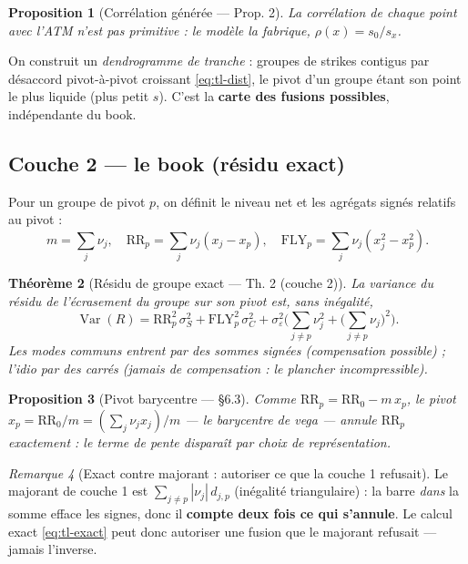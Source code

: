 \documentclass[11pt,a4paper]{article}
\DeclareMathOperator{\Var}{Var}
\newcommand{\abs}[1]{\left| #1 \right|}
\theoremstyle{plain}
\newtheorem{theoreme}{Théorème}[section]
\newtheorem{proposition}[theoreme]{Proposition}
\theoremstyle{definition}
\theoremstyle{remark}
\newtheorem{remarque}[theoreme]{Remarque}
\begin{document}
\begin{proposition}[Corrélation générée --- Prop. 2]
La corrélation de chaque point avec l'ATM n'est pas primitive : le modèle la fabrique,
$\rho(x) = s_0 / s_x$.
\end{proposition}

On construit un \emph{dendrogramme de tranche} : groupes de strikes contigus par
désaccord pivot-à-pivot croissant \eqref{eq:tl-dist}, le pivot d'un groupe étant son
point le plus liquide (plus petit $s$). C'est la \textbf{carte des fusions possibles},
indépendante du book.

\subsection{Couche 2 --- le book (résidu exact)}
Pour un groupe de pivot $p$, on définit le niveau net et les agrégats signés relatifs au
pivot :
\[ m = \textstyle\sum_j \nu_j,\quad
   \mathrm{RR}_p = \textstyle\sum_j \nu_j (x_j - x_p),\quad
   \mathrm{FLY}_p = \textstyle\sum_j \nu_j (x_j^2 - x_p^2). \]

\begin{theoreme}[Résidu de groupe exact --- Th. 2 (couche 2)]\label{th:tl2}
La variance du résidu de l'écrasement du groupe sur son pivot est, \emph{sans
inégalité},
\begin{equation}
\Var(R) = \mathrm{RR}_p^2\,\sigma_S^2 + \mathrm{FLY}_p^2\,\sigma_C^2
+ \sigma_\varepsilon^2\Big(\textstyle\sum_{j\neq p}\nu_j^2
+ \big(\sum_{j\neq p}\nu_j\big)^2\Big).
\label{eq:tl-exact}
\end{equation}
Les modes communs entrent par des sommes \emph{signées} (compensation possible) ;
l'idio par des \emph{carrés} (jamais de compensation : le plancher incompressible).
\end{theoreme}

\begin{proposition}[Pivot barycentre --- \S6.3]\label{prop:bary}
Comme $\mathrm{RR}_p = \mathrm{RR}_0 - m\,x_p$, le pivot $x_p = \mathrm{RR}_0/m =
(\sum_j \nu_j x_j)/m$ --- le barycentre de vega --- annule $\mathrm{RR}_p$ exactement :
le terme de pente disparaît par choix de représentation.
\end{proposition}

\begin{remarque}[Exact contre majorant : autoriser ce que la couche 1 refusait]
Le majorant de couche 1 est $\sum_{j\neq p}\abs{\nu_j}\, d_{j,p}$ (inégalité
triangulaire) : la barre \emph{dans} la somme efface les signes, donc il \textbf{compte
deux fois ce qui s'annule}. Le calcul exact \eqref{eq:tl-exact} peut donc autoriser une
fusion que le majorant refusait --- jamais l'inverse.
\end{remarque}
\end{document}
